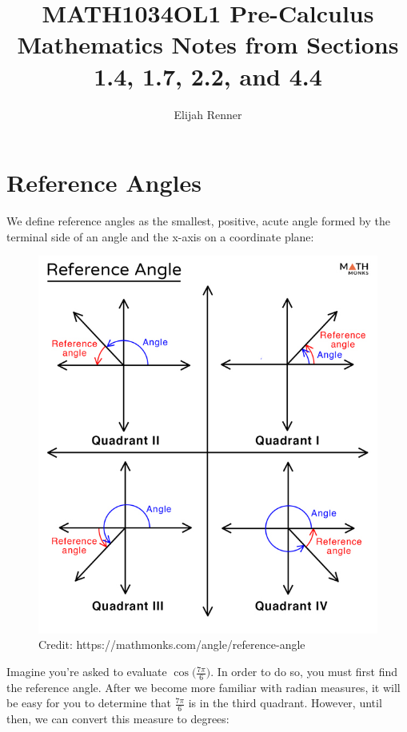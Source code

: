 \documentclass[12pt]{article}
\title{MATH1034OL1 Pre-Calculus Mathematics Notes from Sections 1.4, 1.7, 2.2, and 4.4}
\author{Elijah Renner}
\begin{document}
\maketitle

\vspace{0.5in}

\tableofcontents





\section{Reference Angles}
We define reference angles as the smallest, positive, acute angle formed by the terminal side of an angle and the x-axis on a coordinate plane:\\

\begin{figure}[ht]
	\centering
	\includegraphics[scale=0.25]{Reference-Angle}
	\caption{Credit: https://mathmonks.com/angle/reference-angle}
\end{figure}

Imagine you're asked to evaluate \(\cos({\frac{7\pi}{6})}\). In order to do so, you must first find the reference angle. After we become more familiar with radian measures, it will be easy for you to determine that \(\frac{7\pi}{6}\) is in the third quadrant. However, until then, we can convert this measure to degrees: \\
\end{document}
